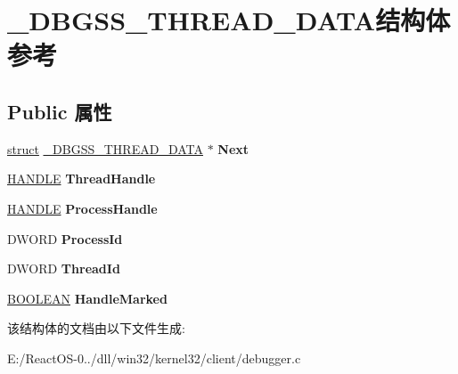 \hypertarget{struct___d_b_g_s_s___t_h_r_e_a_d___d_a_t_a}{}\section{\+\_\+\+D\+B\+G\+S\+S\+\_\+\+T\+H\+R\+E\+A\+D\+\_\+\+D\+A\+T\+A结构体 参考}
\label{struct___d_b_g_s_s___t_h_r_e_a_d___d_a_t_a}
\subsection*{Public 属性}
\begin{DoxyCompactItemize}
\item 
\mbox{\label{struct___d_b_g_s_s___t_h_r_e_a_d___d_a_t_a_a7920358ba38e7745bc5fb63791048519}} 
\hyperlink{interfacestruct}{struct} \hyperlink{struct___d_b_g_s_s___t_h_r_e_a_d___d_a_t_a}{\+\_\+\+D\+B\+G\+S\+S\+\_\+\+T\+H\+R\+E\+A\+D\+\_\+\+D\+A\+TA} $\ast$ {\bfseries Next}
\item 
\mbox{\label{struct___d_b_g_s_s___t_h_r_e_a_d___d_a_t_a_afda29084156bfcf820f0cc263bda0433}} 
\hyperlink{interfacevoid}{H\+A\+N\+D\+LE} {\bfseries Thread\+Handle}
\item 
\mbox{\label{struct___d_b_g_s_s___t_h_r_e_a_d___d_a_t_a_a472e53c268ebe34beb6bd569919ce2f5}} 
\hyperlink{interfacevoid}{H\+A\+N\+D\+LE} {\bfseries Process\+Handle}
\item 
\mbox{\label{struct___d_b_g_s_s___t_h_r_e_a_d___d_a_t_a_a707a16f366efdacf319bcc5bea497bb5}} 
D\+W\+O\+RD {\bfseries Process\+Id}
\item 
\mbox{\label{struct___d_b_g_s_s___t_h_r_e_a_d___d_a_t_a_a1da56bc6de685efdcf7ae8f58c8131bb}} 
D\+W\+O\+RD {\bfseries Thread\+Id}
\item 
\mbox{\label{struct___d_b_g_s_s___t_h_r_e_a_d___d_a_t_a_aa45293d36059d0b54539e6e144ecaa36}} 
\hyperlink{_processor_bind_8h_a112e3146cb38b6ee95e64d85842e380a}{B\+O\+O\+L\+E\+AN} {\bfseries Handle\+Marked}
\end{DoxyCompactItemize}


该结构体的文档由以下文件生成\+:\begin{DoxyCompactItemize}
\item 
E\+:/\+React\+O\+S-\/0../dll/win32/kernel32/client/debugger.\+c\end{DoxyCompactItemize}

